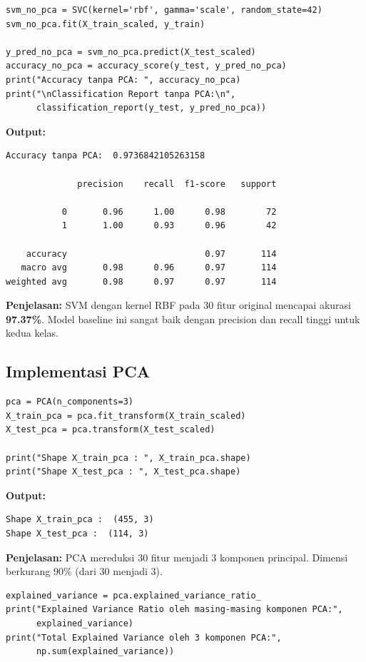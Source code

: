 \documentclass[12pt,a4paper]{article}
\begin{document}
\begin{lstlisting}[caption=Training SVM pada Data Original]
svm_no_pca = SVC(kernel='rbf', gamma='scale', random_state=42)
svm_no_pca.fit(X_train_scaled, y_train)

y_pred_no_pca = svm_no_pca.predict(X_test_scaled)
accuracy_no_pca = accuracy_score(y_test, y_pred_no_pca)
print("Accuracy tanpa PCA: ", accuracy_no_pca)
print("\nClassification Report tanpa PCA:\n", 
      classification_report(y_test, y_pred_no_pca))
\end{lstlisting}

\textbf{Output:}
\begin{verbatim}
Accuracy tanpa PCA:  0.9736842105263158

              precision    recall  f1-score   support

           0       0.96      1.00      0.98        72
           1       1.00      0.93      0.96        42

    accuracy                           0.97       114
   macro avg       0.98      0.96      0.97       114
weighted avg       0.98      0.97      0.97       114
\end{verbatim}

\textbf{Penjelasan:} SVM dengan kernel RBF pada 30 fitur original mencapai akurasi \textbf{97.37\%}. Model baseline ini sangat baik dengan precision dan recall tinggi untuk kedua kelas.

\subsection{Implementasi PCA}

\begin{lstlisting}[caption=Reduksi Dimensi dengan PCA]
pca = PCA(n_components=3)
X_train_pca = pca.fit_transform(X_train_scaled)
X_test_pca = pca.transform(X_test_scaled)

print("Shape X_train_pca : ", X_train_pca.shape)
print("Shape X_test_pca : ", X_test_pca.shape)
\end{lstlisting}

\textbf{Output:}
\begin{verbatim}
Shape X_train_pca :  (455, 3)
Shape X_test_pca :  (114, 3)
\end{verbatim}

\textbf{Penjelasan:} PCA mereduksi 30 fitur menjadi 3 komponen principal. Dimensi berkurang 90\% (dari 30 menjadi 3).

\begin{lstlisting}[caption=Explained Variance Ratio]
explained_variance = pca.explained_variance_ratio_
print("Explained Variance Ratio oleh masing-masing komponen PCA:", 
      explained_variance)
print("Total Explained Variance oleh 3 komponen PCA:", 
      np.sum(explained_variance))
\end{lstlisting}
\end{document}
